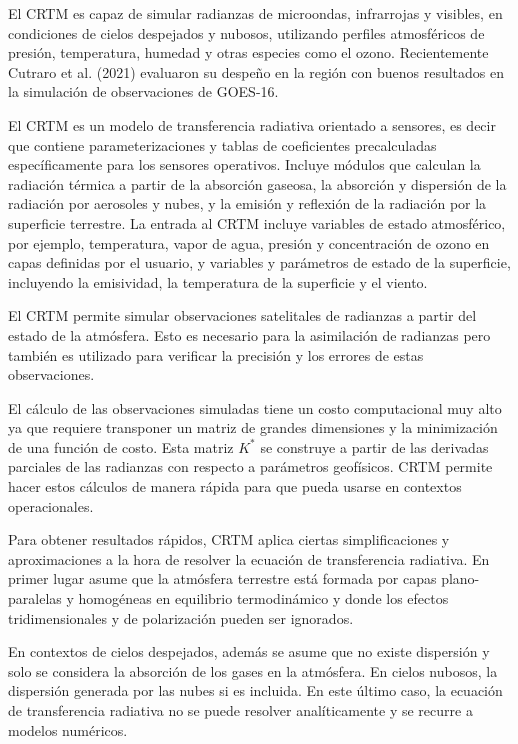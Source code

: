 \documentclass[12pt,oneside,a4paper]{reedthesis}
\begin{document}
El CRTM es capaz de simular radianzas de microondas, infrarrojas y visibles, en condiciones de cielos despejados y nubosos, utilizando perfiles atmosféricos de presión, temperatura, humedad y otras especies como el ozono. Recientemente Cutraro et al. (2021) evaluaron su despeño en la región con buenos resultados en la simulación de observaciones de GOES-16.

El CRTM es un modelo de transferencia radiativa orientado a sensores, es decir que contiene parameterizaciones y tablas de coeficientes precalculadas específicamente para los sensores operativos. Incluye módulos que calculan la radiación térmica a partir de la absorción gaseosa, la absorción y dispersión de la radiación por aerosoles y nubes, y la emisión y reflexión de la radiación por la superficie terrestre. La entrada al CRTM incluye variables de estado atmosférico, por ejemplo, temperatura, vapor de agua, presión y concentración de ozono en capas definidas por el usuario, y variables y parámetros de estado de la superficie, incluyendo la emisividad, la temperatura de la superficie y el viento.

El CRTM permite simular observaciones satelitales de radianzas a partir del estado de la atmósfera. Esto es necesario para la asimilación de radianzas pero también es utilizado para verificar la precisión y los errores de estas observaciones.

El cálculo de las observaciones simuladas tiene un costo computacional muy alto ya que requiere transponer un matriz de grandes dimensiones y la minimización de una función de costo. Esta matriz \(K^{*}\) se construye a partir de las derivadas parciales de las radianzas con respecto a parámetros geofísicos. CRTM permite hacer estos cálculos de manera rápida para que pueda usarse en contextos operacionales.

Para obtener resultados rápidos, CRTM aplica ciertas simplificaciones y aproximaciones a la hora de resolver la ecuación de transferencia radiativa. En primer lugar asume que la atmósfera terrestre está formada por capas plano-paralelas y homogéneas en equilibrio termodinámico y donde los efectos tridimensionales y de polarización pueden ser ignorados.

En contextos de cielos despejados, además se asume que no existe dispersión y solo se considera la absorción de los gases en la atmósfera. En cielos nubosos, la dispersión generada por las nubes si es incluida. En este último caso, la ecuación de transferencia radiativa no se puede resolver analíticamente y se recurre a modelos numéricos.
\end{document}
